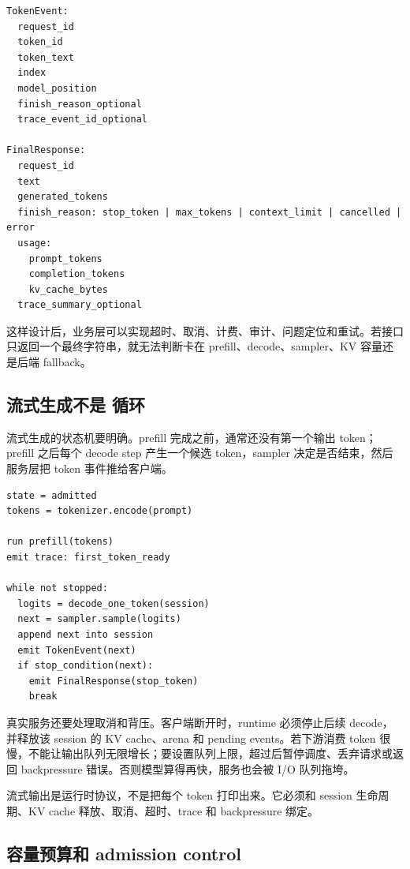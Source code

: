 \begin{lstlisting}[numbers=none,caption={流式响应事件}]
TokenEvent:
  request_id
  token_id
  token_text
  index
  model_position
  finish_reason_optional
  trace_event_id_optional

FinalResponse:
  request_id
  text
  generated_tokens
  finish_reason: stop_token | max_tokens | context_limit | cancelled | error
  usage:
    prompt_tokens
    completion_tokens
    kv_cache_bytes
  trace_summary_optional
\end{lstlisting}

这样设计后，业务层可以实现超时、取消、计费、审计、问题定位和重试。若接口只返回一个最终字符串，就无法判断卡在 prefill、decode、sampler、KV 容量还是后端 fallback。

\subsection{流式生成不是  循环}

流式生成的状态机要明确。prefill 完成之前，通常还没有第一个输出 token；prefill 之后每个 decode step 产生一个候选 token，sampler 决定是否结束，然后服务层把 token 事件推给客户端。

\begin{lstlisting}[numbers=none,caption={流式生成状态机}]
state = admitted
tokens = tokenizer.encode(prompt)

run prefill(tokens)
emit trace: first_token_ready

while not stopped:
  logits = decode_one_token(session)
  next = sampler.sample(logits)
  append next into session
  emit TokenEvent(next)
  if stop_condition(next):
    emit FinalResponse(stop_token)
    break
\end{lstlisting}

真实服务还要处理取消和背压。客户端断开时，runtime 必须停止后续 decode，并释放该 session 的 KV cache、arena 和 pending events。若下游消费 token 很慢，不能让输出队列无限增长；要设置队列上限，超过后暂停调度、丢弃请求或返回 backpressure 错误。否则模型算得再快，服务也会被 I/O 队列拖垮。

\begin{warningbox}
流式输出是运行时协议，不是把每个 token 打印出来。它必须和 session 生命周期、KV cache 释放、取消、超时、trace 和 backpressure 绑定。
\end{warningbox}

\subsection{容量预算和 admission control}

